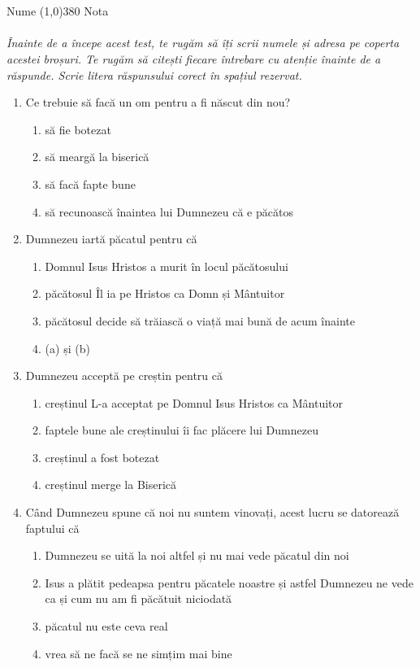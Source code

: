 \\
\\
Nume \line(1,0){380} \hspace{0.3cm} Nota \liniescurta
\\
\\
\noindent \textsl{Înainte de a începe acest test, te rugăm să îți scrii numele și adresa pe coperta acestei broșuri. Te rugăm să citești fiecare întrebare cu atenție înainte de a răspunde. Scrie litera răspunsului corect în spațiul rezervat.}

\begin{enumerate}[itemsep=19pt]
	\item Ce trebuie să facă un om pentru a fi născut din nou?
		\begin{enumerate}
			\item să fie botezat
			\item să meargă la biserică
			\item să facă fapte bune
			\item să recunoască înaintea lui Dumnezeu că e păcătos
			\liniescurta
		\end{enumerate}
		
	\item Dumnezeu iartă păcatul pentru că
		\begin{enumerate}
			\item Domnul Isus Hristos a murit în locul păcătosului
			\item păcătosul Îl ia pe Hristos ca Domn și Mântuitor
			\item păcătosul decide să trăiască o viață mai bună de acum înainte
			\item (a) și (b)
			\liniescurta
		\end{enumerate}
		
	\item Dumnezeu acceptă pe creștin pentru că
		\begin{enumerate}
			\item creștinul L-a acceptat pe Domnul Isus Hristos ca Mântuitor
			\item faptele bune ale creștinului îi fac plăcere lui Dumnezeu
			\item creștinul a fost botezat
			\item creștinul merge la Biserică
			\liniescurta
		\end{enumerate}
	
	\item Când Dumnezeu spune că noi nu suntem vinovați, acest lucru se datorează faptului că
		\begin{enumerate}
			\item Dumnezeu se uită la noi altfel și nu mai vede păcatul din noi
			\item Isus a plătit pedeapsa pentru păcatele noastre și astfel Dumnezeu ne vede ca și cum nu am fi păcătuit niciodată
			\item păcatul nu este ceva real
			\item vrea să ne facă se ne simțim mai bine
			\liniescurta
		\end{enumerate}
		

\end{enumerate}
